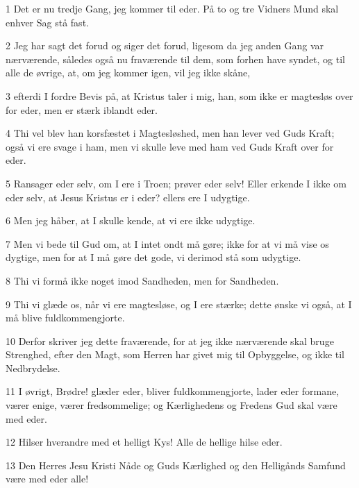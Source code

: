 \par 1 Det er nu tredje Gang, jeg kommer til eder. På to og tre Vidners Mund skal enhver Sag stå fast.
\par 2 Jeg har sagt det forud og siger det forud, ligesom da jeg anden Gang var nærværende, således også nu fraværende til dem, som forhen have syndet, og til alle de øvrige, at, om jeg kommer igen, vil jeg ikke skåne,
\par 3 efterdi I fordre Bevis på, at Kristus taler i mig, han, som ikke er magtesløs over for eder, men er stærk iblandt eder.
\par 4 Thi vel blev han korsfæstet i Magtesløshed, men han lever ved Guds Kraft; også vi ere svage i ham, men vi skulle leve med ham ved Guds Kraft over for eder.
\par 5 Ransager eder selv, om I ere i Troen; prøver eder selv! Eller erkende I ikke om eder selv, at Jesus Kristus er i eder? ellers ere I udygtige.
\par 6 Men jeg håber, at I skulle kende, at vi ere ikke udygtige.
\par 7 Men vi bede til Gud om, at I intet ondt må gøre; ikke for at vi må vise os dygtige, men for at I må gøre det gode, vi derimod stå som udygtige.
\par 8 Thi vi formå ikke noget imod Sandheden, men for Sandheden.
\par 9 Thi vi glæde os, når vi ere magtesløse, og I ere stærke; dette ønske vi også, at I må blive fuldkommengjorte.
\par 10 Derfor skriver jeg dette fraværende, for at jeg ikke nærværende skal bruge Strenghed, efter den Magt, som Herren har givet mig til Opbyggelse, og ikke til Nedbrydelse.
\par 11 I øvrigt, Brødre! glæder eder, bliver fuldkommengjorte, lader eder formane, værer enige, værer fredsommelige; og Kærlighedens og Fredens Gud skal være med eder.
\par 12 Hilser hverandre med et helligt Kys! Alle de hellige hilse eder.
\par 13 Den Herres Jesu Kristi Nåde og Guds Kærlighed og den Helligånds Samfund være med eder alle!



